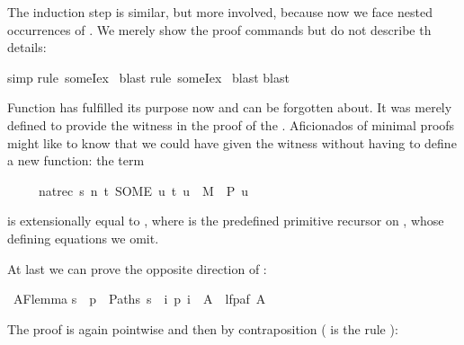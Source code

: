 \begin{isabellebody}
\begin{isamarkuptxt}
The induction step is similar, but more involved, because now we face nested occurrences of
. We merely show the proof commands but do not describe th details:%
\end{isamarkuptxt}%
simp{\isacharparenright}\isanewline
{}rule\ someI{}{\isacharunderscore}ex{\isacharparenright}\isanewline
\ blast{\isacharparenright}\isanewline
{}rule\ someI{}{\isacharunderscore}ex{\isacharparenright}\isanewline
\ blast{\isacharparenright}\isanewline
{}blast{\isacharparenright}\isanewline
{}%
\begin{isamarkuptext}%
Function  has fulfilled its purpose now and can be forgotten
about. It was merely defined to provide the witness in the proof of the
. Aficionados of minimal proofs might like to know
that we could have given the witness without having to define a new function:
the term
\begin{isabelle}%
\ \ \ \ \ nat{\isacharunderscore}rec\ s\ {\isacharparenleft}{\isasymlambda}n\ t{\isachardot}\ SOME\ u{\isachardot}\ {\isacharparenleft}t{\isacharcomma}\ u{\isacharparenright}\ {\isasymin}\ M\ {\isasymand}\ P\ u{\isacharparenright}%
\end{isabelle}
is extensionally equal to ,
where  is the predefined primitive recursor on , whose defining
equations we omit.%
\end{isamarkuptext}%
%
\begin{isamarkuptext}%
At last we can prove the opposite direction of :%
\end{isamarkuptext}%
\ AF{\isacharunderscore}lemma{}{\isacharcolon}\isanewline
{\isachardoublequote}{\isacharbraceleft}s{\isachardot}\ {\isasymforall}\ p\ {\isasymin}\ Paths\ s{\isachardot}\ {\isasymexists}\ i{\isachardot}\ p\ i\ {\isasymin}\ A{\isacharbraceright}\ {\isasymsubseteq}\ lfp{\isacharparenleft}af\ A{\isacharparenright}{\isachardoublequote}%
\begin{isamarkuptxt}%
\noindent
The proof is again pointwise and then by contraposition ( is the rule
):%

\end{isamarkuptxt}
\end{isabellebody}
